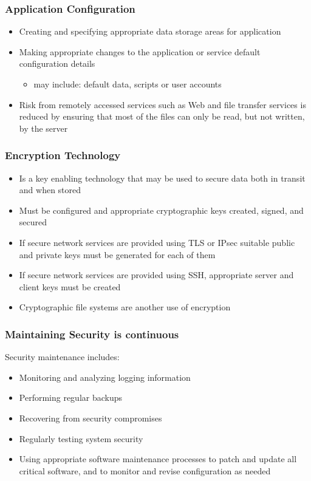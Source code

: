 \subsubsection{Application Configuration}
\begin{itemize}
    \item Creating and specifying appropriate data storage areas for application
    \item Making appropriate changes to the application or service default configuration details
    \begin{itemize}
        \item may include: default data, scripts or user accounts
    \end{itemize}
    \item Risk from remotely accessed services such as Web and file transfer services is reduced by ensuring that most of the files can only be read, but not written, by the server
\end{itemize}

\subsubsection{Encryption Technology}
\begin{itemize}
    \item Is a key enabling technology that may be used to secure data both in transit and when stored
    \item Must be configured and appropriate cryptographic keys created, signed, and secured
    \item If secure network services are provided using TLS or IPsec suitable public and private keys must be generated for each of them
    \item If secure network services are provided using SSH, appropriate server and client keys must be created
    \item Cryptographic file systems are another use of encryption
\end{itemize}

\subsubsection{Maintaining Security is continuous}
Security maintenance includes:
\begin{itemize}
    \item Monitoring and analyzing logging information
    \item Performing regular backups
    \item Recovering from security compromises
    \item Regularly testing system security
    \item Using appropriate software maintenance processes to patch and update all critical software, and to monitor and revise configuration as needed
\end{itemize}

